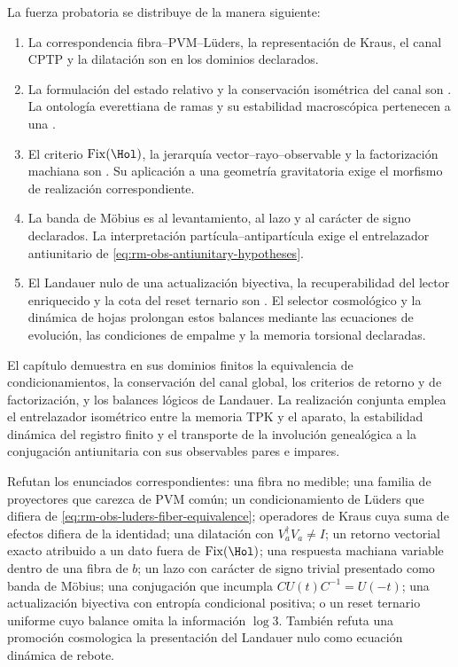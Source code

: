 La fuerza probatoria se distribuye de la manera siguiente:
\begin{enumerate}[label=\textup{(\roman*)}]
 \item La correspondencia fibra--PVM--L\"uders, la representaci\'on de
 Kraus, el canal CPTP y la dilataci\'on son
  en los dominios declarados.
 \item La formulaci\'on del estado relativo y la conservaci\'on isom\'etrica
 del canal son . La ontolog\'ia everettiana de ramas y su
 estabilidad macrosc\'opica pertenecen a una
 .
 \item El criterio
 \(\operatorname{Fix}(\Hol)\), la jerarqu\'ia
 vector--rayo--observable y la factorizaci\'on machiana son
 . Su aplicaci\'on a una geometr\'ia
 gravitatoria exige el morfismo de realizaci\'on correspondiente.
 \item La banda de M\"obius es  al
 levantamiento, al lazo y al car\'acter de signo declarados. La
 interpretaci\'on part\'icula--antipart\'icula exige el entrelazador
 antiunitario de \cref{eq:rm-obs-antiunitary-hypotheses}.
 \item El Landauer nulo de una actualizaci\'on biyectiva, la recuperabilidad
 del lector enriquecido y la cota del reset ternario son
 . El selector cosmológico y la
 dinámica de hojas prolongan estos balances mediante las ecuaciones de
 evolución, las condiciones de empalme y la memoria torsional declaradas.
\end{enumerate}

\begin{proofstatusbox}
El cap\'itulo demuestra en sus dominios finitos la equivalencia de
condicionamientos, la conservaci\'on del canal global, los criterios de
retorno y de factorizaci\'on, y los balances l\'ogicos de Landauer. La
realización conjunta emplea el entrelazador isométrico entre la memoria TPK y
el aparato, la estabilidad dinámica del registro finito y el transporte de la
involución genealógica a la conjugación antiunitaria con sus observables pares
e impares.
\end{proofstatusbox}

\begin{falsifierbox}
Refutan los enunciados correspondientes: una fibra no medible; una familia
de proyectores que carezca de PVM com\'un; un condicionamiento de L\"uders
que difiera de \cref{eq:rm-obs-luders-fiber-equivalence}; operadores de
Kraus cuya suma de efectos difiera de la identidad; una dilataci\'on con
\(V_a^\dagger V_a\neq I\); un retorno vectorial exacto atribuido a un dato
fuera de \(\operatorname{Fix}(\Hol)\); una respuesta machiana variable dentro de una
fibra de \(b\); un lazo con car\'acter de signo trivial presentado como banda
de M\"obius; una conjugaci\'on que incumpla
\(CU(t)C^{-1}=U(-t)\); una actualizaci\'on biyectiva con entrop\'ia
condicional positiva; o un reset ternario uniforme cuyo balance omita la
informaci\'on \(\log3\). Tambi\'en refuta una promoci\'on cosmologica la
presentaci\'on del Landauer nulo como ecuaci\'on din\'amica de rebote.
\end{falsifierbox}
